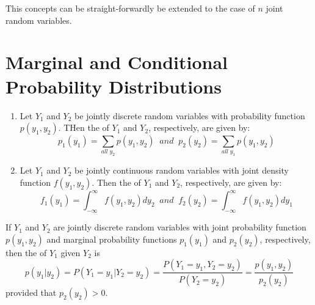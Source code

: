 \documentclass[12pt, a4paper, twoside, openright, titlepage]{book}
\begin{document}
This concepts can be straight-forwardly be extended to the case of $n$ joint random variables.

\section{\textsection Marginal and Conditional Probability Distributions}

\begin{defn}{}{}
    \leavevmode
    \begin{enumerate}
        \item Let $Y_1$ and $Y_2$ be jointly discrete random variables with probability function $p(y_1,y_2)$. THen the  of $Y_1$ and $Y_2$, respectively, are given by: \begin{equation*}
                p_1(y_1) = \sum\limits_{all\;y_2}p(y_1,y_2)\;\;and\;\;p_2(y_2) = \sum\limits_{all\;y_1}p(y_1,y_2)
        \end{equation*}
        \item Let $Y_1$ and $Y_2$ be jointly continuous random variables with joint density function $f(y_1,y_2)$. Then the  of $Y_1$ and $Y_2$, respectively, are given by: \begin{equation*}
            f_1(y_1) = \int_{-\infty}^{\infty}f(y_1,y_2)dy_2\;\;and\;\;f_2(y_2) = \int_{-\infty}^{\infty}f(y_1,y_2)dy_1
        \end{equation*}
    \end{enumerate}
\end{defn}



\begin{defn}{}{}
    If $Y_1$ and $Y_2$ are jointly discrete random variables with joint probability function $p(y_1,y_2)$ and marginal probability functions $p_1(y_1)$ and $p_2(y_2)$, respectively, then the  of $Y_1$ given $Y_2$ is \begin{equation*}
        p(y_1\vert y_2) = P(Y_1=y_1\vert Y_2 = y_2) = \frac{P(Y_1=y_1,Y_2=y_2)}{P(Y_2=y_2)} = \frac{p(y_1,y_2)}{p_2(y_2)}
    \end{equation*}
    provided that $p_2(y_2) > 0$.
\end{defn}
\end{document}

